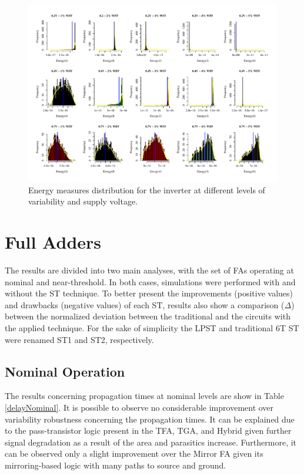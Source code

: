 \documentclass[diss,pgmicro,english]{iiufrgs}
\begin{document}
     \begin{figure}[]
        \centering
            \includegraphics[width=1.5\textwidth, trim={0cm 0cm 0cm 0cm}, clip, angle=90]{dist_energy_0_2.pdf}
            \caption{Energy measures distribution for the inverter at different levels of variability and supply voltage.}
        \label{fig:energyDist0_2}
    \end{figure}

\chapter{Full Adders}

The results are divided into two main analyses, with the set of FAs operating at nominal and near-threshold. In both cases, simulations were performed with and without the ST technique. To better present the improvements (positive values) and drawbacks (negative values) of each ST, results also show a comparison ($\Delta$) between the normalized deviation between the traditional and the circuits with the applied technique. For the sake of simplicity the LPST and traditional 6T ST were renamed ST1 and ST2, respectively.

\section{Nominal Operation}

The results concerning propagation times at nominal levels are show in Table \ref{delayNominal}. It is possible to observe no considerable improvement over variability robustness concerning the propagation times. It can be explained due to the pass-transistor logic present in the TFA, TGA, and Hybrid given further signal degradation as a result of the area and parasitics increase. Furthermore, it can be observed only a slight improvement over the Mirror FA given its mirroring-based logic with many paths to source and ground.
\end{document}
